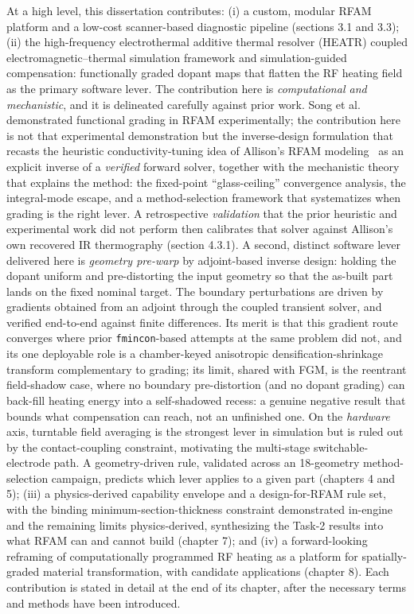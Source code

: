 At a high level, this dissertation contributes: (i) a custom, modular RFAM
platform and a low-cost scanner-based diagnostic pipeline (sections 3.1 and 3.3);
(ii) the high-frequency electrothermal additive thermal resolver (HEATR) coupled electromagnetic--thermal simulation framework and
simulation-guided compensation: functionally graded dopant maps that flatten the
RF heating field as the primary software lever. The contribution here is
\emph{computational and mechanistic}, and it is delineated carefully against prior
work. Song et al.~\cite{Song2025RFAMUniformity} demonstrated functional grading in
RFAM experimentally; the contribution here is not that experimental demonstration
but the inverse-design formulation that recasts the heuristic conductivity-tuning
idea of Allison's RFAM modeling~\cite{allison2022computational} as an explicit
inverse of a \emph{verified} forward solver, together with the mechanistic theory that
explains the method: the fixed-point ``glass-ceiling'' convergence analysis, the
integral-mode escape, and a method-selection framework that systematizes when grading
is the right lever. A retrospective \emph{validation} that the prior heuristic and
experimental work did not perform then calibrates that solver against Allison's own recovered
IR thermography (section 4.3.1). A second, distinct software
lever delivered here is \emph{geometry pre-warp} by adjoint-based inverse design:
holding the dopant uniform and pre-distorting the input geometry so that the
as-built part lands on the fixed nominal target. The boundary perturbations are
driven by gradients obtained from an adjoint through the coupled transient solver,
and verified end-to-end against finite differences. Its merit is that this gradient
route converges where prior \texttt{fmincon}-based attempts at the same problem did
not, and its one deployable role is a chamber-keyed anisotropic
densification-shrinkage transform complementary to grading; its limit, shared with FGM, is
the reentrant field-shadow case, where no
boundary pre-distortion (and no dopant grading) can back-fill heating energy into a
self-shadowed recess: a genuine negative result that bounds what compensation can
reach, not an unfinished one. On the \emph{hardware} axis,
turntable field averaging is the strongest lever in simulation but is ruled out by
the contact-coupling constraint, motivating the multi-stage switchable-electrode
path. A geometry-driven rule, validated across an 18-geometry method-selection
campaign, predicts which lever applies to a given part
(chapters 4 and 5); (iii) a
physics-derived capability envelope and a design-for-RFAM rule set, with the binding
minimum-section-thickness constraint demonstrated in-engine and the remaining limits
physics-derived, synthesizing the Task-2 results into what RFAM can and cannot build
(chapter 7); and (iv) a forward-looking reframing of
computationally programmed RF heating as a platform for spatially-graded material
transformation, with candidate applications (chapter 8).
Each contribution is stated in detail at the end of its chapter, after the
necessary terms and methods have been introduced.
